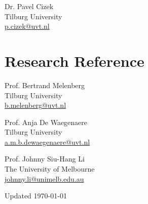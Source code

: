 \documentclass[12pt,letterpaper]{report}
\begin{document}
	
Dr. Pavel Cizek\\
Tilburg University\\	
\href{mailto:p.cizek@uvt.nl}{p.cizek\textrm{@}uvt.nl}

	

\section*{Research Reference}
\begin{multicols}{3}
	
	Prof. Bertrand Melenberg\\
	Tilburg University\\
	 \href{mailto:B.Melenberg@uvt.nl}{b.melenberg\textrm{@}uvt.nl}
	 
	 \vfill\columnbreak
	 
	 Prof. Anja De Waegenaere\\
	 Tilburg University\\ \href{mailto:a.m.b.dewaegenaere@uvt.nl}{a.m.b.dewaegenaere\textrm{@}uvt.nl}
	
	\vfill\columnbreak

	Prof. Johnny Siu-Hang Li\\
	The University of Melbourne\\ \href{mailto:johnny.li@unimelb.edu.au}{johnny.li\textrm{@}unimelb.edu.au}
	
\end{multicols}




    \begin{center}
        \vfill
        Updated \monthyeardate\today
    \end{center}
\end{document}
